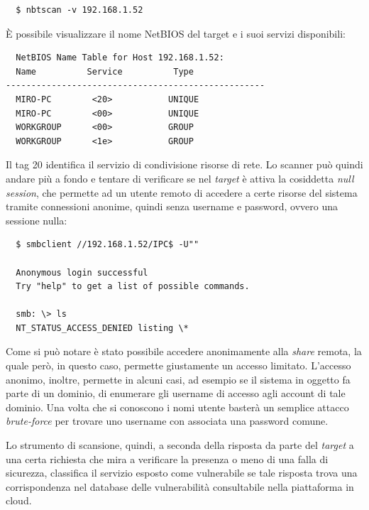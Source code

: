 \documentclass[target=mst,aauheader=]{thud}
\begin{document}
\begin{verbatim}
  $ nbtscan -v 192.168.1.52
\end{verbatim}

È possibile visualizzare il nome NetBIOS del target e i suoi servizi disponibili:

\begin{verbatim}
  NetBIOS Name Table for Host 192.168.1.52:
  Name          Service          Type
---------------------------------------------------
  MIRO-PC        <20>           UNIQUE
  MIRO-PC        <00>           UNIQUE
  WORKGROUP      <00>           GROUP
  WORKGROUP      <1e>           GROUP
\end{verbatim}

Il tag 20 identifica il servizio di condivisione risorse di rete. Lo scanner può quindi andare più a fondo e tentare di verificare se nel \textit{target} è attiva la cosiddetta \textit{null session}, che permette ad un utente remoto di accedere a certe risorse del sistema tramite connessioni anonime, quindi senza username e password, ovvero una sessione nulla:

\begin{verbatim}
  $ smbclient //192.168.1.52/IPC$ -U""

  Anonymous login successful
  Try "help" to get a list of possible commands.
  
  smb: \> ls
  NT_STATUS_ACCESS_DENIED listing \*
\end{verbatim}

Come si può notare è stato possibile accedere anonimamente alla \textit{share} remota, la quale però, in questo caso, permette giustamente un accesso limitato. L’accesso anonimo, inoltre, permette in alcuni casi, ad esempio se il sistema in oggetto fa parte di un dominio, di enumerare gli username di accesso agli account di tale dominio. Una volta che si conoscono i nomi utente basterà un semplice attacco \textit{brute-force} per trovare uno username con associata una password comune.

Lo strumento di scansione, quindi, a seconda della risposta da parte del \textit{target} a una certa richiesta che mira a verificare la presenza o meno di una falla di sicurezza, classifica il servizio esposto come vulnerabile se tale risposta trova una corrispondenza nel database delle vulnerabilità consultabile nella piattaforma in cloud.
\end{document}
